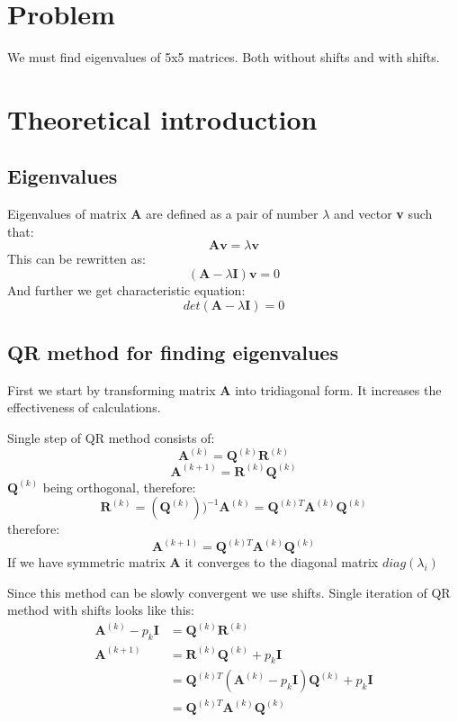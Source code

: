\documentclass[12pt]{report}
\begin{document}
\section{Problem}
We must find eigenvalues of 5x5 matrices. Both without shifts and with shifts.
\section{Theoretical introduction}
\subsection{Eigenvalues}
Eigenvalues of matrix \textbf{A} are defined as a pair of number $\lambda$ and vector \textbf{v} such that:
\[ \mathbf{A}\mathbf{v} = \lambda\mathbf{v} \]
This can be rewritten as:
\[ (\mathbf{A} - \lambda\mathbf{I})\mathbf{v} = 0 \]
And further we get characteristic equation:
\[ det(\mathbf{A} - \lambda\mathbf{I}) = 0 \]

\newpage
\subsection{QR method for finding eigenvalues}
First we start by transforming matrix \textbf{A} into tridiagonal form. It increases the effectiveness of calculations.

Single step of QR method consists of:
\[ \textbf{A}^{(k)} = \textbf{Q}^{(k)}\textbf{R}^{(k)} \]
\[ \textbf{A}^{(k+1)} = \textbf{R}^{(k)}\textbf{Q}^{(k)} \]
$\textbf{Q}^{(k)}$ being orthogonal, therefore:
\[ \textbf{R}^{(k)} = (\textbf{Q}^{(k)}))^{-1}\textbf{A}^{(k)} = \textbf{Q}^{(k)T}\textbf{A}^{(k)}\textbf{Q}^{(k)} \]
therefore:
\[ \textbf{A}^{(k+1)} = \textbf{Q}^{(k)T}\textbf{A}^{(k)}\textbf{Q}^{(k)} \]
If we have symmetric matrix \textbf{A} it converges to the diagonal matrix $diag(\lambda_i)$

Since this method can be slowly convergent we use shifts. Single iteration of QR method with shifts looks like this:
\begin{equation}
\begin{split}
\textbf{A}^{(k)} - p_k\textbf{I} &= \textbf{Q}^{(k)}\textbf{R}^{(k)} \\
\textbf{A}^{(k+1)} &= \textbf{R}^{(k)}\textbf{Q}^{(k)} + p_k\textbf{I} \\
&= \textbf{Q}^{(k)T}(\textbf{A}^{(k)} - p_k\textbf{I})\textbf{Q}^{(k)} + p_k\textbf{I} \\
&=\textbf{Q}^{(k)T}\textbf{A}^{(k)}\textbf{Q}^{(k)} \\
\end{split}
\end{equation}
\end{document}
